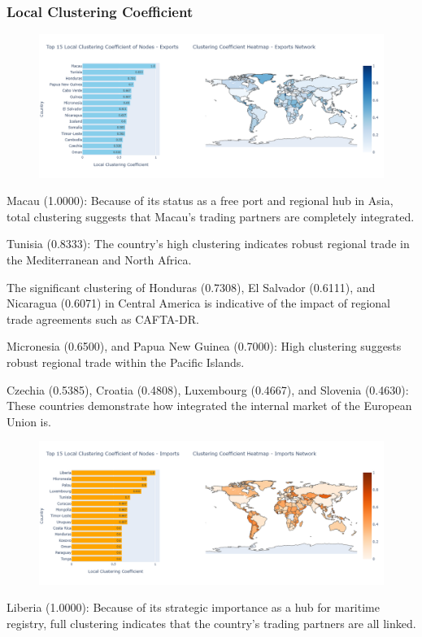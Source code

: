 \documentclass[12pt, a4paper]{article}
\begin{document}
\subsubsection{Local Clustering Coefficient}
\begin{figure}[ht]
\centering
\includegraphics[width=\textwidth]{img/exportlcc.png}
\label{fig:exportlcc}
\end{figure}
Macau (1.0000): Because of its status as a free port and regional hub in Asia, total clustering suggests that Macau's trading partners are completely integrated.

Tunisia (0.8333): The country's high clustering indicates robust regional trade in the Mediterranean and North Africa.

The significant clustering of Honduras (0.7308), El Salvador (0.6111), and Nicaragua (0.6071) in Central America is indicative of the impact of regional trade agreements such as CAFTA-DR.

Micronesia (0.6500), and Papua New Guinea (0.7000): High clustering suggests robust regional trade within the Pacific Islands.

Czechia (0.5385), Croatia (0.4808), Luxembourg (0.4667), and Slovenia (0.4630): These countries demonstrate how integrated the internal market of the European Union is.

\begin{figure}[ht]
\centering
\includegraphics[width=\textwidth]{img/importlcc.png}
\label{fig:importlcc}
\end{figure}
Liberia (1.0000): Because of its strategic importance as a hub for maritime registry, full clustering indicates that the country's trading partners are all linked.
\end{document}
